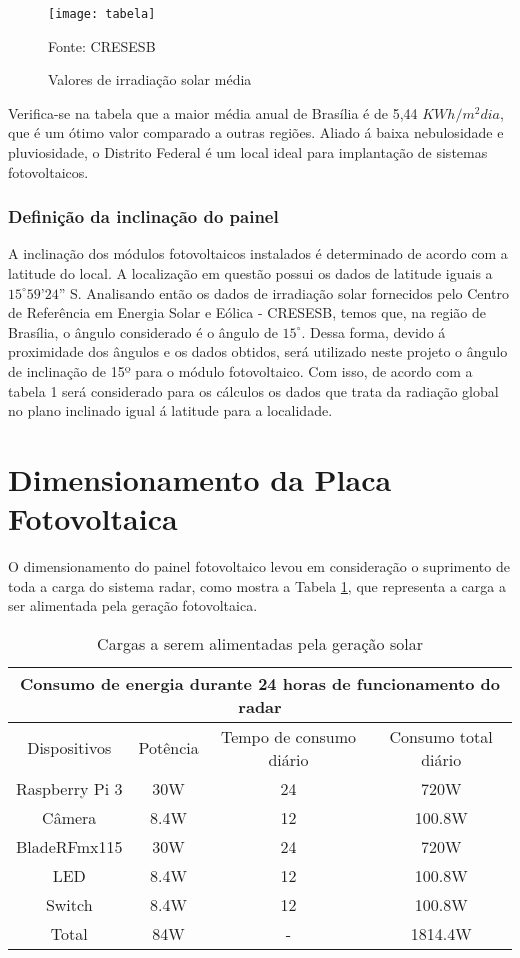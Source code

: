 \begin{figure}[h!]
\centering
\texttt{[image: tabela]}
\caption{Valores de irradiação solar média}
Fonte: CRESESB
\label{fig:tabela}
\end{figure}

Verifica-se na tabela que a maior média anual de Brasília é de 5,44 $KWh/m^2dia$, que é um ótimo valor comparado a outras regiões. Aliado á baixa nebulosidade e pluviosidade, o Distrito Federal é um local ideal para implantação de sistemas fotovoltaicos.

\subsubsection{Definição da inclinação do painel}

 A inclinação dos módulos fotovoltaicos instalados é determinado de acordo com a latitude do local. A localização em questão possui os dados de latitude iguais a $15^{\circ}59’24”$ S. Analisando então os dados de irradiação solar fornecidos pelo Centro de Referência em Energia Solar e Eólica - CRESESB, temos que, na região de Brasília, o ângulo considerado é o ângulo de $15^{\circ}$. Dessa forma, devido á proximidade dos ângulos e os dados obtidos, será utilizado neste projeto o ângulo de inclinação de 15º para o módulo fotovoltaico.
 Com isso, de acordo com a tabela 1 será considerado para os  cálculos os dados que  trata da radiação global no plano inclinado  igual á latitude para a localidade.
 
\section{Dimensionamento da Placa Fotovoltaica}

O dimensionamento do painel fotovoltaico levou em consideração o suprimento de toda a carga do sistema radar, como mostra a Tabela \ref{tab24}, que representa a carga a ser alimentada pela geração fotovoltaica. 

\begin{table}[H]
\caption{Cargas a serem alimentadas pela geração solar}\label{tab24}
\begin{tabular}{|c|c|c|c|}
\hline
\multicolumn{4}{|c|}{Consumo de energia durante 24 horas de funcionamento do radar}                                                 \\ \hline
Dispositivos & Potência & Tempo de consumo diário & Consumo total diário \\ \hline
Raspberry Pi 3  & 30W  & 24  & 720W  \\ \hline
Câmera & 8.4W  & 12 & 100.8W \\ \hline
BladeRFmx115 & 30W  & 24 & 720W \\ \hline
LED       & 8.4W &  12 & 100.8W  \\ \hline
Switch       & 8.4W &  12 & 100.8W \\ \hline
Total & 84W & - & 1814.4W \\ \hline

\end{tabular}
\end{table}
\FloatBarrier

